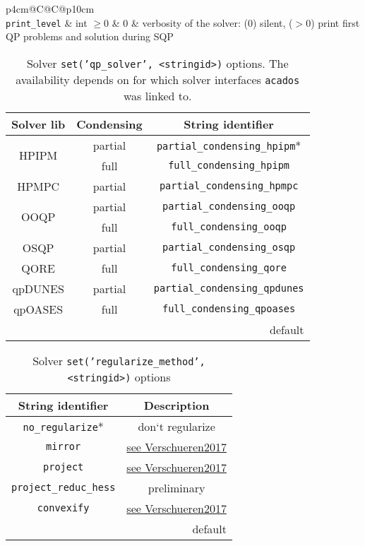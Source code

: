 \documentclass[
a4paper, %
10pt, %
notitlepage,
english]{CSUniSchoolLabReport}
\newcommand{\code}[1]{\texttt{#1}}
\newcommand{\str}[1]{\texttt{'#1'}}
\newcommand{\acados}{\texttt{acados}}
\begin{document}
\begin{appendices}
\begin{table}
\begin{tabulary}{\textwidth}{p{4cm}@{}C@{}C@{}p{10cm}}
		\midrule
		 \\
		\code{print\_level} & int $\geq 0$ & $0$ & verbosity of the solver: ($0$) silent, ($>0$) print first QP problems and solution during SQP\\
		\bottomrule
	\end{tabulary}
\end{table}
%
\begin{table}
	\centering
	\caption{Solver \code{set(\str{qp\_solver}, <stringid>)} options. The availability depends on for which solver interfaces \acados{} was linked to.}\label{tab:solver_options:qp_solver_option}
	\begin{tabular}{c@{ }c@{}c}
		\toprule
		Solver lib & Condensing & {String identifier} \\ \midrule
		\multirow{2}{1.2cm}{\centering HPIPM} & partial & \code{partial\_condensing\_hpipm}*\\
		& full & \code{full\_condensing\_hpipm} \\[1ex]
		HPMPC & partial & \code{partial\_condensing\_hpmpc} \\[1ex]
		\multirow{2}{2cm}{\centering OOQP} & partial & \code{partial\_condensing\_ooqp} \\
		& full & \code{full\_condensing\_ooqp} \\[1ex]
		OSQP & partial & \code{partial\_condensing\_osqp} \\
		QORE & full & \code{full\_condensing\_qore} \\
		qpDUNES & partial & \code{partial\_condensing\_qpdunes} \\
		qpOASES & full & \code{full\_condensing\_qpoases} \\
		\bottomrule
		\multicolumn{3}{r}{\footnotesize * default}
	\end{tabular}
\end{table}
%
\begin{table}
	\centering
	\caption{Solver \code{set(\str{regularize\_method}, <stringid>)} options}
	\label{tab:solver_options:regularize_method}
	\begin{tabular}{cc}
		\toprule
		String identifier & Description \\\midrule
		\code{no\_regularize}* & don‘t regularize \\
		\code{mirror} & \href{https://cdn.syscop.de/publications/Verschueren2017.pdf}{see Verschueren2017} \\
		\code{project} & \href{https://cdn.syscop.de/publications/Verschueren2017.pdf}{see Verschueren2017} \\
		\code{project\_reduc\_hess} & preliminary \\
		\code{convexify} & \href{https://cdn.syscop.de/publications/Verschueren2017.pdf}{see Verschueren2017} \\
		\bottomrule
		\multicolumn{2}{r}{\footnotesize * default}
	\end{tabular}
\end{table}

\end{appendices}
\end{document}

